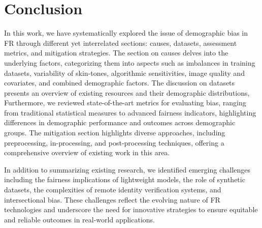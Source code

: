 \section{Conclusion}
\label{sec:conc}

In this work, we have systematically explored the issue of demographic bias in
FR through different yet interrelated sections: causes, datasets, assessment
metrics, and mitigation strategies. The section on causes delves into the
underlying factors, categorizing them into aspects such as imbalances in
training datasets, variability of skin-tones, algorithmic sensitivities, image
quality and covariates, and combined demographic factors. The discussion on
datasets presents an overview of existing resources and their demographic
distributions, Furthermore, we reviewed state-of-the-art metrics for evaluating
bias, ranging from traditional statistical measures to advanced fairness
indicators, highlighting differences in demographic performance and outcomes
across demographic groups. The mitigation section highlights diverse
approaches, including preprocessing, in-processing, and post-processing
techniques, offering a comprehensive overview of existing work in this area.

In addition to summarizing existing research, we identified emerging challenges
including the fairness implications of lightweight models, the role of synthetic
datasets, the complexities of remote identity verification systems, and
intersectional bias. These challenges reflect the evolving nature of FR
technologies and underscore the need for innovative strategies to ensure
equitable and reliable outcomes in real-world applications.

   
